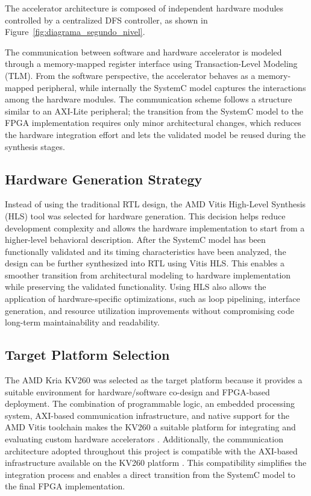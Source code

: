 \documentclass[conference]{IEEEtran}
\begin{document}
The accelerator architecture is composed of independent hardware modules controlled by a centralized DFS controller, as shown in Figure~\ref{fig:diagrama_segundo_nivel}.

The communication between software and hardware accelerator is modeled through a memory-mapped register interface using Transaction-Level Modeling (TLM). From the software perspective, the accelerator behaves as a memory-mapped peripheral, while internally the SystemC model captures the interactions among the hardware modules.
The communication scheme follows a structure similar to an AXI-Lite peripheral; the transition from the SystemC model to the FPGA implementation requires only minor architectural changes, which reduces the hardware integration effort and lets the validated model be reused during the synthesis stages.


\subsection{Hardware Generation Strategy}

Instead of using the traditional RTL design, the AMD Vitis High-Level Synthesis (HLS) tool was selected for hardware generation. This decision helps reduce development complexity and allows the hardware implementation to start from a higher-level behavioral description. After the SystemC model has been functionally validated and its timing characteristics have been analyzed, the design can be further synthesized into RTL using Vitis HLS. This enables a smoother transition from architectural modeling to hardware implementation while preserving the validated functionality.
Using HLS also allows the application of hardware-specific optimizations, such as loop pipelining, interface generation, and resource utilization improvements without compromising code  long-term maintainability and readability.

\subsection{Target Platform Selection}
The AMD Kria KV260 was selected as the target platform because it provides a suitable environment for hardware/software co-design and FPGA-based deployment.
The combination of programmable logic, an embedded processing system, AXI-based communication infrastructure, and native support for the AMD Vitis toolchain makes the KV260 a suitable platform for integrating and evaluating custom hardware accelerators \cite{amd_kv260_user_guide, amd_vitis_hls_user_guide}.
Additionally, the communication architecture adopted throughout this project is compatible with the AXI-based infrastructure available on the KV260 platform \cite{arm_axi_protocol}. This compatibility simplifies the integration process and enables a direct transition from the SystemC model to the final FPGA implementation.
\end{document}
